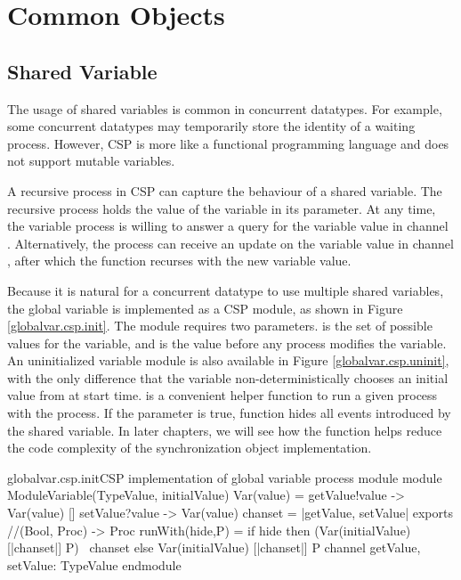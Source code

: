 \documentclass{article}
\begin{document}
\section{Common Objects}
\subsection{Shared Variable}
The usage of shared variables is common in concurrent datatypes. For example, some concurrent datatypes may temporarily store the identity of a waiting process. However, CSP is more like a functional programming language and does not support mutable variables. 

A recursive process in CSP can capture the behaviour of a shared variable. The recursive process holds the value of the variable in its parameter. At any time, the variable process is willing to answer a query for the variable value in channel . Alternatively, the process can receive an update on the variable value in channel , after which the function recurses with the new variable value.

Because it is natural for a concurrent datatype to use multiple shared variables, the global variable is implemented as a CSP module, as shown in Figure \ref{globalvar.csp.init}. The module requires two parameters.  is the set of possible values for the variable, and  is the value before any process modifies the variable. An uninitialized variable module is also available in Figure \ref{globalvar.csp.uninit}, with the only difference that the variable non-deterministically chooses an initial value from  at start time.  is a convenient helper function to run a given process  with the  process. If the parameter  is true,  function hides all events introduced by the shared variable. In later chapters, we will see how the  function helps reduce the code complexity of the synchronization object implementation.

\begin{cspinline}{globalvar.csp.init}{CSP implementation of global variable process module}
module ModuleVariable(TypeValue, initialValue)
  Var(value) = getValue!value -> Var(value)
             [] setValue?value -> Var(value)
  chanset = {|getValue, setValue|}
exports
  //(Bool, Proc) -> Proc
  runWith(hide,P) = if hide then (Var(initialValue) [|chanset|] P) \ chanset
                            else  Var(initialValue) [|chanset|] P
  channel getValue, setValue: TypeValue
endmodule
\end{cspinline}
\end{document}
